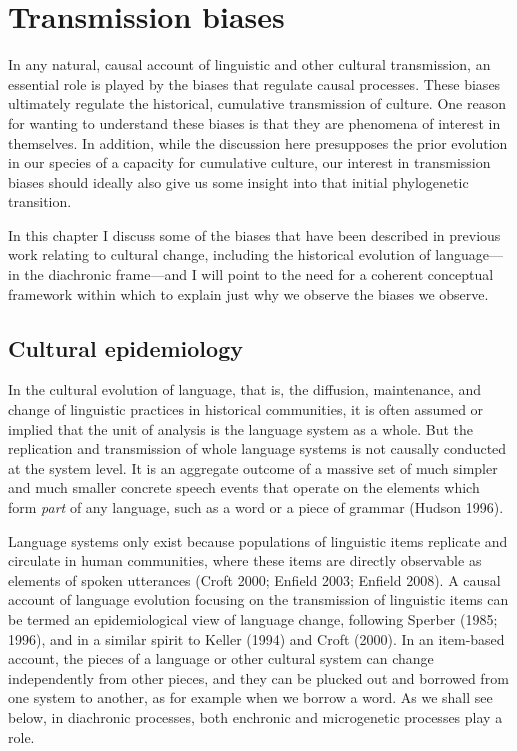 
\chapter{Transmission biases}




In any natural, causal account of linguistic and other cultural 
transmission, an essential role is played by the biases that regulate 
causal processes. These biases ultimately regulate the 
historical, cumulative transmission of culture. One reason for wanting 
to understand these biases is that they are phenomena of interest in 
themselves. In addition, while the discussion here presupposes the prior 
evolution in our species of a capacity for cumulative culture, our 
interest in transmission biases should ideally also give us some insight 
into that initial phylogenetic transition. 

In this chapter I discuss some of the biases that have been described in 
previous work relating to cultural change, including the historical 
evolution of language---in the diachronic frame---and I will point to the need for a coherent 
conceptual framework within which to explain just why we observe the 
biases we observe. 


\section{Cultural epidemiology}


In the cultural evolution of language, that is, the diffusion, 
maintenance, and change of linguistic practices in historical 
communities, it is often assumed or implied that the unit of analysis is 
the language system as a whole. But the replication and transmission of 
whole language systems is not causally conducted at the system level. It 
is an aggregate outcome of a massive set of much simpler and much 
smaller concrete speech events that operate on the elements which form 
\textit{part} of any language, such as a word or a piece of grammar 
(Hudson 1996). 



Language systems only exist because populations of linguistic items 
replicate and circulate in human communities, where these items are 
directly observable as elements of spoken utterances (Croft 2000; 
Enfield 2003; Enfield 2008). A causal account of language evolution 
focusing on the transmission of linguistic items can be termed an 
epidemiological view of language change, following Sperber (1985; 1996), 
and in a similar spirit to Keller (1994) and Croft (2000). In an 
item-based account, the pieces of a language or other cultural system 
can change independently from other pieces, and they can be plucked out 
and borrowed from one system to another, as for example when we borrow a 
word. As we shall see below, in diachronic processes, both enchronic and microgenetic processes play a role.



